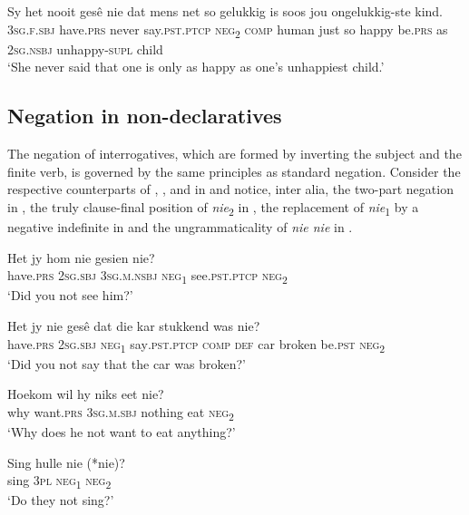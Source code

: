 \documentclass[output=paper,colorlinks,citecolor=brown]{langscibook}
\begin{document}
\ea\label{ex:afr:9}
    \gll Sy het nooit gesê nie dat mens net so gelukkig is soos jou ongelukkig-ste kind. \\ 
    \textsc{3sg.f.sbj} have.\textsc{prs} never say.\textsc{pst.ptcp} \textsc{neg}\textsubscript{2} \textsc{comp} human just so happy be.\textsc{prs} as \textsc{2sg.nsbj} unhappy-\textsc{supl} child\\
    \glt ‘She never said that one is only as happy as one’s unhappiest child.’
\z 


\subsection{Negation in non-declaratives}
\label{sec:afr:2.2}
The negation of interrogatives, which are formed by inverting the subject and the finite verb, is governed by the same principles as standard negation. Consider the respective counterparts of , ,  and  in  and notice, inter alia, the two-part negation in , the truly clause-final position of \textit{nie}\textsubscript{2} in , the replacement of \textit{nie}\textsubscript{1} by a negative indefinite in  and the ungrammaticality of \textit{nie nie} in .

\ea\label{ex:afr:10}
    \ea\label{ex:afr:10a}
        \gll Het jy hom nie gesien nie? \\ 
             have.\textsc{prs} \textsc{2sg.sbj} \textsc{3sg.m.nsbj} \textsc{neg}\textsubscript{1} see.\textsc{pst.ptcp} \textsc{neg}\textsubscript{2} \\
        \glt ‘Did you not see him?’
    
    \ex\label{ex:afr:10b}
        \gll Het jy nie gesê dat die kar stukkend was nie? \\
             have.\textsc{prs} \textsc{2sg.sbj} \textsc{neg}\textsubscript{1} say\textsc{.pst.ptcp} \textsc{comp} \textsc{def} car  broken be.\textsc{pst} \textsc{neg}\textsubscript{2} \\
        \glt ‘Did you not say that the car was broken?’
 
    \ex\label{ex:afr:10c}
        \gll Hoekom wil hy niks eet nie? \\ 
             why want.\textsc{prs} \textsc{3sg.m.sbj} nothing eat \textsc{neg}\textsubscript{2} \\
        \glt ‘Why does he not want to eat anything?’
    
    \ex\label{ex:afr:10d}
        \gll Sing hulle nie (*nie)? \\
             sing  3\textsc{pl}  \textsc{neg}\textsubscript{1} \textsc{neg}\textsubscript{2}\\
        \glt ‘Do they not sing?’
    \z
\z 
\end{document}
